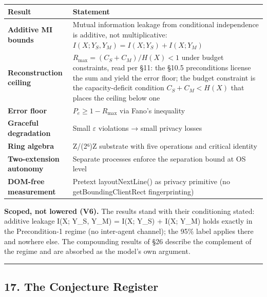 \documentclass[
  11pt,
]{article}
\newcounter{none} %
\begin{document}
{\def\LTcaptype{none} %
\begin{longtable}[]{@{}
  >{\raggedright\arraybackslash}p{}
  >{\raggedright\arraybackslash}p{}@{}}
\toprule\noalign{}
\begin{minipage}[b]{\linewidth}\raggedright
Result
\end{minipage} & \begin{minipage}[b]{\linewidth}\raggedright
Statement
\end{minipage} \\
\midrule\noalign{}
\endhead
\bottomrule\noalign{}
\endlastfoot
\textbf{Additive MI bounds} & Mutual information leakage from
conditional independence is additive, not multiplicative:
\(I(X; Y_S, Y_M) = I(X; Y_S) + I(X; Y_M)\) \\
\textbf{Reconstruction ceiling} & \(R_{\max} = (C_S + C_M)/H(X) < 1\)
under budget constraints, read per §11: the §10.5 preconditions license
the sum and yield the error floor; the budget constraint is the
capacity-deficit condition \(C_S + C_M < H(X)\) that places the ceiling
below one \\
\textbf{Error floor} & \(P_e \geq 1 - R_{\max}\) via Fano's
inequality \\
\textbf{Graceful degradation} & Small \(\varepsilon\) violations → small
privacy losses \\
\textbf{Ring algebra} & Z/(2⁶)Z substrate with five operations and
critical identity \\
\textbf{Two-extension autonomy} & Separate processes enforce the
separation bound at OS level \\
\textbf{DOM-free measurement} & Pretext layoutNextLine() as privacy
primitive (no getBoundingClientRect fingerprinting) \\
\end{longtable}
}

\textbf{Scoped, not lowered (V6).} The results stand with their
conditioning stated: additive leakage I(X; Y\_S, Y\_M) = I(X; Y\_S) +
I(X; Y\_M) holds exactly in the Precondition-1 regime (no inter-agent
channel); the 95\% label applies there and nowhere else. The compounding
results of §26 describe the complement of the regime and are absorbed as
the model's own argument.

\begin{center}\rule{0.5\linewidth}{0.5pt}\end{center}

\subsection{17. The Conjecture Register}\label{the-conjecture-register}
\end{document}
